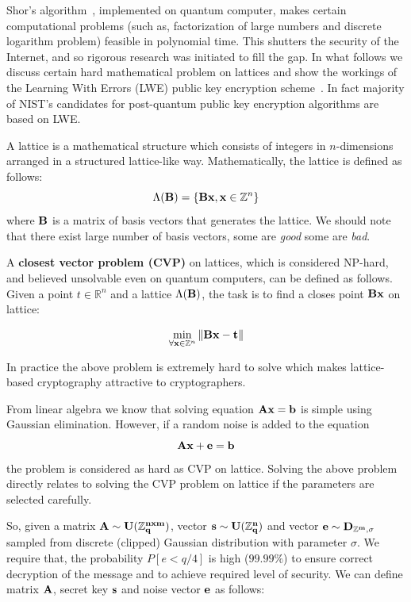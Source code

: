 Shor's algorithm~\cite{shor}, implemented on quantum computer, makes certain computational 
problems (such as, factorization of large numbers and discrete logarithm problem) 
feasible in polynomial time. This shutters the security of the Internet, and 
so rigorous research was initiated to fill the gap. In what follows we discuss
certain hard mathematical problem on lattices and show the workings of the 
Learning With Errors (LWE) public key encryption scheme~\cite{regev}. In fact majority of 
NIST's candidates for post-quantum public key encryption algorithms are based 
on LWE.

A lattice is a mathematical structure which consists of integers in $n$-dimensions 
arranged in a structured lattice-like way. Mathematically, the lattice is defined as follows:
$$\Lambda({\bf B}) = \{{\bf Bx}, {\bf x} \in \mathbb{Z}^n \}$$ where ${\bf B}$ is a matrix of basis vectors
that generates the lattice. We should note that there exist large number of basis vectors, some are {\it good}
some are {\it bad}.

A { \bf closest vector problem (CVP) } on lattices, which is considered NP-hard, and believed unsolvable even on 
quantum computers, can be defined as follows. Given a point $t \in \mathbb{R}^n$ and a lattice
$\Lambda({\bf B})$, the task is to find a closes point ${\bf Bx}$ on lattice: 

$$\min_{\forall {\bf x} \in \mathbb{Z}^n} \|{\bf Bx} - {\bf t}\|$$ 

In practice the above problem is extremely hard to solve which makes lattice-based cryptography 
attractive to cryptographers.

From linear algebra we know that solving equation $\bf{Ax}=\bf{b}$ is simple using
Gaussian elimination. However, if a random noise is added to the equation $$\bf{Ax} + \bf{e} = \bf{b}$$ the 
problem is considered as hard as CVP on lattice. Solving the above problem directly relates to 
solving the CVP problem on lattice if the parameters are selected carefully.

So, given a matrix $\bf{A} \sim U(\mathbb{Z}^{nxm}_q)$, vector $\bf{s} \sim U(\mathbb{Z}^{n}_q)$ and 
vector $\bf{e} \sim D_{\mathbb{Z}^{m}, \sigma}$ sampled from discrete (clipped) Gaussian distribution with parameter $\sigma$. We require that, the probability
$P[e < q/4]$ is high (\ie $99.99\%$) to ensure correct decryption of the message and to achieve required 
level of security. We can define matrix ${\bf A}$, secret key ${\bf s}$ and noise vector ${\bf e}$ as follows:

